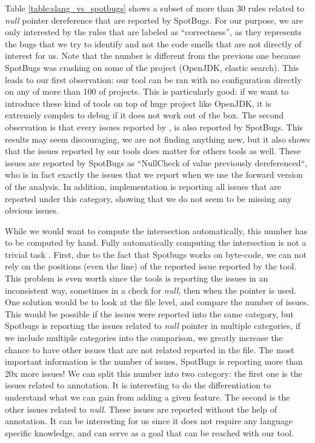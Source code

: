 Table \ref{table:slang_vs_spotbugs} shows a subset of more than 30 rules related to \emph{null} pointer dereference that are reported by SpotBugs. 
For our purpose, we are only interested by the rules that are labeled as “correctness”, as they represents the bugs that we try to identify and not the code smells that are not directly of interest for us. \newline
Note that the number is different from the previous one because SpotBugs was crashing on some of the project (OpenJDK, elastic search). 
This leads to our first observation: our tool can be ran with no configuration directly on any of more than 100 of projects.
This is particularly good: if we want to introduce these kind of tools on top of huge project like OpenJDK, it is extremely complex to debug if it does not work out of the box. 
The second observation is that every issues reported by \slang{}, is also reported by SpotBugs. This results may seem discouraging, we are not finding anything new, but it also shows that the issues reported by our tools does matter for others tools as well. 
These issues are reported by SpotBugs as “NullCheck of value previously dereferenced“, who is in fact exactly the issues that we report when we use the forward version of the analysis. 
In addition, \slang{} implementation is reporting all issues that are reported under this category, showing that we do not seem to be missing any obvious issues. \newline

While we would want to compute the intersection automatically, this number has to be computed by hand. 
Fully automatically computing the intersection is not a trivial task \cite{Gabel:2010:OIE:1806799.1806806}. 
First, due to the fact that Spotbugs works on byte-code, we can not rely on the positions (even the line) of the reported issue reported by the tool. 
This problem is even worth since the tools is reporting the issues in an inconsistent way, sometimes in a check for \emph{null}, then when the pointer is used. 
One solution would be to look at the file level, and compare the number of issues. 
This would be possible if the issues were reported into the same category, but Spotbugs is reporting the issues related to \emph{null} pointer in multiple categories, if we include multiple categories into the comparison, we greatly increase the chance to have other issues that are not related reported in the file. \newline
The most important information is the number of issues, SpotBugs is reporting more than 20x more issues! 
We can split this number into two category: the first one is the issues related to annotation. It is interesting to do the differentiation to understand what we can gain from adding a given feature. 
The second is the other issues related to \emph{null}. 
These issues are reported without the help of annotation. 
It can be interesting for us since it does not require any language specific knowledge, and can serve as a goal that can be reached with our tool.


